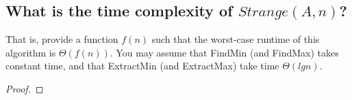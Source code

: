 \documentclass[a4paper]{article}
\begin{document}
\subsection{What is the time complexity of $Strange(A, n)$? }
That is, provide a function $f(n)$
such that the worst-case runtime of this algorithm is $\Theta( f(n) )$. You may assume that FindMin (and FindMax) takes constant time, and that ExtractMin (and
ExtractMax) take time $\Theta(lg n)$.
\begin{proof}

\end{proof}
\end{document}
